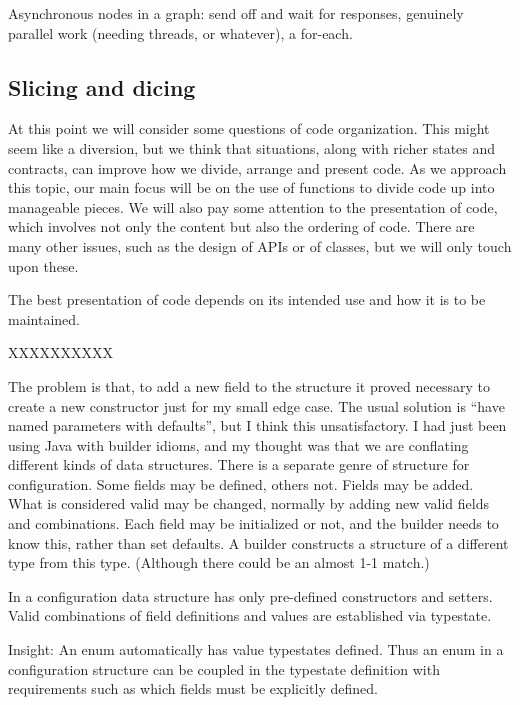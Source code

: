 \documentclass[10pt]{amsart}
\begin{document}
Asynchronous nodes in a graph: send off and wait for responses,
genuinely parallel work (needing threads, or whatever), a for-each.


\subsection{Slicing and dicing}

At this point we will consider some questions of code organization.
This might seem like a diversion, but we think that situations, along
with richer states and contracts, can improve how we divide, arrange
and present code.  As we approach this topic, our main focus will be
on the use of functions to divide code up into manageable pieces.  We
will also pay some attention to the presentation of code, which
involves not only the content but also the ordering of code.  There
are many other issues, such as the design of APIs or of classes, but
we will only touch upon these.

The best presentation of code depends on its intended use and how it
is to be maintained.

  XXXXXXXXXX




The problem is that, to add a new field to the structure it proved
necessary to create a new constructor just for my small edge case.
The usual solution is ``have named parameters with defaults'', but I
think this unsatisfactory.  I had just been using Java with builder
idioms, and my thought was that we are conflating different kinds of
data structures.  There is a separate genre of structure for
configuration.  Some fields may be defined, others not.  Fields may be
added.  What is considered valid may be changed, normally by adding
new valid fields and combinations.  Each field may be initialized or
not, and the builder needs to know this, rather than set defaults.  A
builder constructs a structure of a different type from this type.
(Although there could be an almost 1-1 match.)

In \Utop a configuration data structure has only pre-defined
constructors and setters.  Valid combinations of field definitions and
values are established via typestate.

Insight: An enum automatically has value typestates defined.  Thus an
enum in a configuration structure can be coupled in the typestate
definition with requirements such as which fields must be explicitly
defined.
\end{document}
